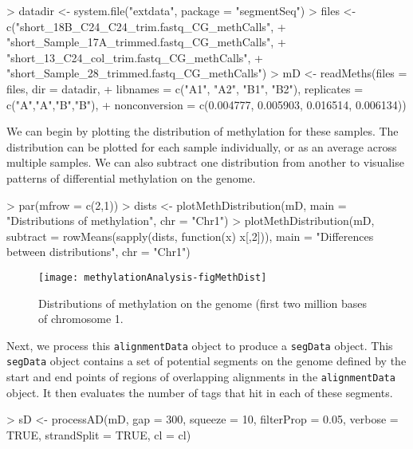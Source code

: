 \documentclass[a4paper]{article}
\begin{document}
\begin{Schunk}
\begin{Sinput}
> datadir <- system.file("extdata", package = "segmentSeq")
> files <- c("short_18B_C24_C24_trim.fastq_CG_methCalls",
+ "short_Sample_17A_trimmed.fastq_CG_methCalls",
+ "short_13_C24_col_trim.fastq_CG_methCalls",
+ "short_Sample_28_trimmed.fastq_CG_methCalls")
> mD <- readMeths(files = files, dir = datadir,
+ libnames = c("A1", "A2", "B1", "B2"), replicates = c("A","A","B","B"),
+ nonconversion = c(0.004777, 0.005903, 0.016514, 0.006134))
\end{Sinput}
\end{Schunk}

We can begin by plotting the distribution of methylation for these samples. The distribution can be plotted for each sample individually, or as an average across multiple samples. We can also subtract one distribution from another to visualise patterns of differential methylation on the genome.

\begin{Schunk}
\begin{Sinput}
> par(mfrow = c(2,1))
> dists <- plotMethDistribution(mD, main = "Distributions of methylation", chr = "Chr1")
> plotMethDistribution(mD, subtract = rowMeans(sapply(dists, function(x) x[,2])), main = "Differences between distributions", chr = "Chr1")
\end{Sinput}
\end{Schunk}

\begin{figure}[!ht]
\begin{center}
\texttt{[image: methylationAnalysis-figMethDist]}
\caption{Distributions of methylation on the genome (first two million bases of chromosome 1.}
\label{fig:Seg}
\end{center}
\end{figure}


Next, we process this \verb'alignmentData' object to produce a \verb'segData' object. This \verb'segData' object contains a set of potential segments on the genome defined by the start and end points of regions of overlapping alignments in the \verb'alignmentData' object. It then evaluates the number of tags that hit in each of these segments.

\begin{Schunk}
\begin{Sinput}
> sD <- processAD(mD, gap = 300, squeeze = 10, filterProp = 0.05, verbose = TRUE, strandSplit = TRUE, cl = cl)
\end{Sinput}
\end{Schunk}
\end{document}
